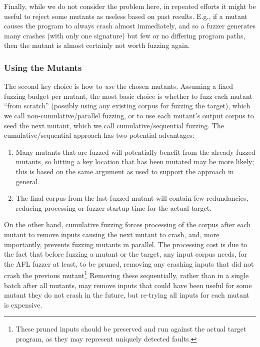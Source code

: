 Finally, while we do not consider the problem here, in repeated efforts it
might be useful to reject some mutants as useless based on past
results.  E.g., if a mutant causes the program to always crash almost
immediately, and so a fuzzer generates many crashes (with only one
signature) but few or no
differing program paths, then the mutant is almost certainly not worth
fuzzing again.

\subsubsection{Using the Mutants}

The second key choice is how to \emph{use} the chosen mutants.
Assuming a fixed fuzzing budget per mutant, the most
basic choice is whether to fuzz each mutant ``from scratch'' (possibly using any existing corpus for
fuzzing the target), which we call non-cumulative/parallel fuzzing,  or to use each mutant's output corpus to seed the next mutant, which we call cumulative/sequential fuzzing.  The cumulative/sequential
approach has two potential advantages:

\begin{enumerate}
\item Many mutants that are fuzzed will potentially benefit from
the already-fuzzed mutants, so hitting a key location that has been
mutated may be more likely; this is based on the same argument as used to support
the approach in general.
\item The final corpus from the last-fuzzed mutant will contain few redundancies, reducing processing or
fuzzer startup time for the actual target.
\end{enumerate}

On the other hand, cumulative fuzzing forces processing of the corpus
after each mutant to remove inputs causing the next mutant to crash,
and, more importantly, prevents fuzzing mutants in parallel.  The
processing cost is due to the fact that before fuzzing a mutant or the
target, any input corpus needs, for the AFL fuzzer at least, to be
pruned, removing any crashing inputs that did not crash the previous
mutant\footnote{These pruned inputs should be preserved and run
  against the actual target program, as they may represent uniquely
  detected faults.}  Removing these sequentially, rather than in a
single batch after all mutants, may remove inputs that could have been
useful for some mutant they do not crash in the future, but re-trying
all inputs for each mutant is expensive.

